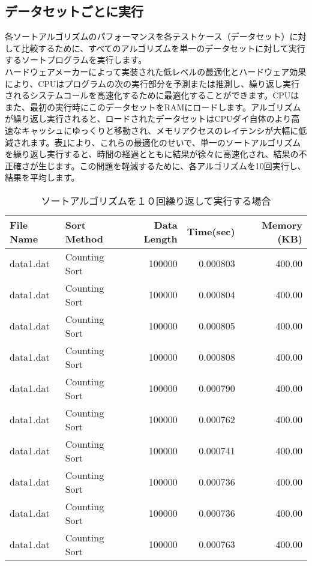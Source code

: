 \documentclass[a4j, 12pt]{jarticle}
\begin{document}
\subsection{データセットごとに実行}
各ソートアルゴリズムのパフォーマンスを各テストケース（データセット）に対して比較するために、すべてのアルゴリズムを単一のデータセットに対して実行するソートプログラムを実行します。\\
ハードウェアメーカーによって実装された低レベルの最適化とハードウェア効果により、CPUはプログラムの次の実行部分を予測または推測し、繰り返し実行されるシステムコールを高速化するために最適化することができます\cite{mittal2018branch}。CPUはまた、最初の実行時にこのデータセットをRAMにロードします。アルゴリズムが繰り返し実行されると、ロードされたデータセットはCPUダイ自体のより高速なキャッシュにゆっくりと移動され、メモリアクセスのレイテンシが大幅に低減されます\cite{apple2023siliconcpuopt}。表\ref{repeatedsortresult}により、これらの最適化のせいで、単一のソートアルゴリズムを繰り返し実行すると、時間の経過とともに結果が徐々に高速化され、結果の不正確さが生じます。この問題を軽減するために、各アルゴリズムを10回実行し、結果を平均します。
\begin{table}[H]
  \centering
  \caption{ソートアルゴリズムを１０回繰り返して実行する場合}\label{repeatedsortresult}
  \begin{tabular}{|l|l|r|r|r|}
    \hline
    \textbf{File Name} & \textbf{Sort Method} & \textbf{Data Length} & \textbf{Time(sec)} & \textbf{Memory (KB)} \\
    \hline
    data1.dat & Counting Sort & 100000 & 0.000803 & 400.00 \\
    data1.dat & Counting Sort & 100000 & 0.000804 & 400.00 \\
    data1.dat & Counting Sort & 100000 & 0.000805 & 400.00 \\
    data1.dat & Counting Sort & 100000 & 0.000808 & 400.00 \\
    data1.dat & Counting Sort & 100000 & 0.000790 & 400.00 \\
    data1.dat & Counting Sort & 100000 & 0.000762 & 400.00 \\
    data1.dat & Counting Sort & 100000 & 0.000741 & 400.00 \\
    data1.dat & Counting Sort & 100000 & 0.000736 & 400.00 \\
    data1.dat & Counting Sort & 100000 & 0.000736 & 400.00 \\
    data1.dat & Counting Sort & 100000 & 0.000763 & 400.00 \\
    \hline
  \end{tabular}
\end{table}
\end{document}
